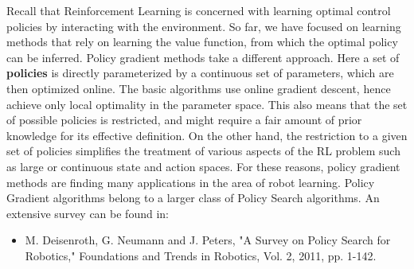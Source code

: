 Recall that Reinforcement Learning is concerned with learning optimal control policies by interacting with the environment. So far, we have focused on learning methods that rely on learning the value function, from which the optimal policy can be inferred.
Policy gradient methods take a different approach. Here a set of \textbf{policies} is directly parameterized by a continuous set of parameters, which are then optimized online. The basic algorithms use online gradient descent, hence achieve only local optimality in the parameter space.
This also means that the set of possible policies is restricted, and might require a fair amount of prior knowledge for its effective definition. On the other hand, the restriction to a given set of policies simplifies the treatment of various aspects of the RL problem such as large or continuous state and action spaces. For these reasons, policy gradient methods are finding many applications in the area of robot learning.
Policy Gradient algorithms belong to a larger class of Policy Search algorithms. An extensive survey can be found in:
\begin{itemize}
  \item M. Deisenroth, G. Neumann and J. Peters, "A Survey on Policy Search for Robotics," Foundations and Trends in Robotics, Vol. 2, 2011, pp. 1-142.
\end{itemize}
%



